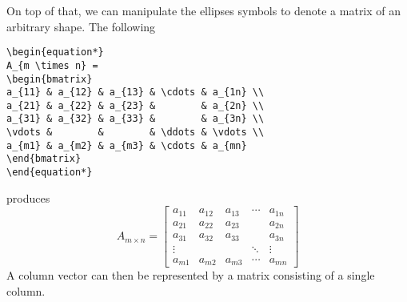 On top of that, we can manipulate the ellipses symbols to denote a matrix of an arbitrary shape. The following
\begin{lstlisting}
\begin{equation*}
A_{m \times n} = 
\begin{bmatrix}
a_{11} & a_{12} & a_{13} & \cdots & a_{1n} \\
a_{21} & a_{22} & a_{23} &        & a_{2n} \\
a_{31} & a_{32} & a_{33} &        & a_{3n} \\
\vdots &        &        & \ddots & \vdots \\
a_{m1} & a_{m2} & a_{m3} & \cdots & a_{mn}
\end{bmatrix}
\end{equation*}
\end{lstlisting}
produces
\begin{equation*}
A_{m \times n} = 
\begin{bmatrix}
a_{11} & a_{12} & a_{13} & \cdots & a_{1n} \\
a_{21} & a_{22} & a_{23} &        & a_{2n} \\
a_{31} & a_{32} & a_{33} &        & a_{3n} \\
\vdots &        &        & \ddots & \vdots \\
a_{m1} & a_{m2} & a_{m3} & \cdots & a_{mn}
\end{bmatrix}
\end{equation*}
A column vector can then be represented by a matrix consisting of a single column.

